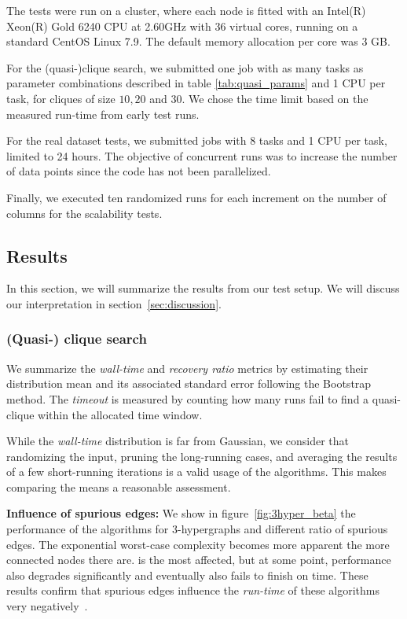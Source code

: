 The tests were run on a cluster, where each node
is fitted with an Intel(R) Xeon(R) Gold 6240 CPU at 2.60GHz with 36 virtual cores,
running on a standard CentOS Linux 7.9. The default memory allocation per core was
3 GB. 

For the (quasi-)clique search, we submitted one job with as many tasks as
parameter combinations described in table \ref{tab:quasi_params} and 1 CPU per task,
for cliques of size $10, 20$ and $30$.  We chose the time limit based on the measured
run-time from early test runs.

For the real dataset tests, we submitted jobs with 8 tasks and 1 CPU per task,
limited to 24 hours. The objective of concurrent runs was to increase the number
of data points since the code has not been parallelized.

Finally, we executed ten randomized runs for each increment on the number of columns for the scalability tests.

\subsection{Results}
\label{sec:results}

In this section, we will summarize the results from our test setup. We
will discuss our interpretation in section~\ref{sec:discussion}.

\subsubsection{(Quasi-) clique search}
\label{sec:result_quasi_search}

We summarize the \emph{wall-time} and \emph{recovery ratio} metrics by estimating
their distribution mean and its associated standard error following the Bootstrap method.
The \emph{timeout} is measured by counting how many runs fail to find a quasi-clique within
the allocated time window.

While the \emph{wall-time} distribution is far from Gaussian, we consider that randomizing the
input, pruning the long-running cases, and averaging the results of a few short-running
iterations is a valid usage of the algorithms. This makes comparing the means a reasonable
assessment.

\textbf{Influence of spurious edges:}
We show in figure~\ref{fig:3hyper_beta} the performance of the algorithms for $3$-hypergraphs
and different ratio of spurious edges. The exponential worst-case
complexity becomes more apparent the more connected nodes there are.
\Find is the most affected, but at some point, \PresQ performance also degrades significantly and eventually also fails to finish on time.
These results confirm that spurious edges influence the
\emph{run-time} of these algorithms very negatively~\cite{koeller2006heuristic}.

